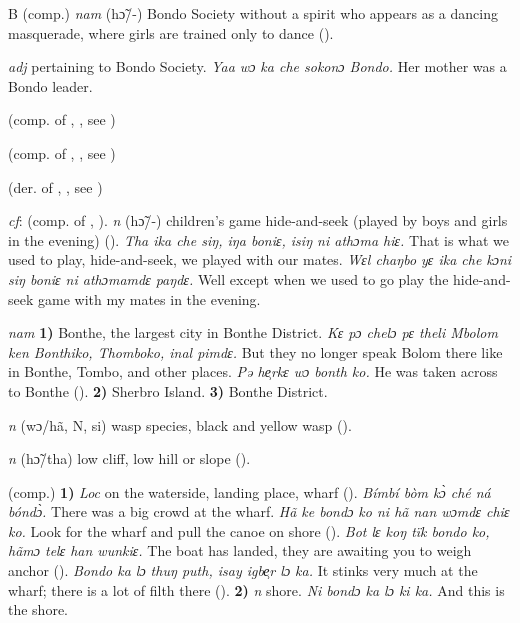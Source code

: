 \begin{letter}{B}
 (comp.) \textit{nam} (hɔ̃/-) Bondo Society without a spirit who appears as a dancing masquerade, where girls are trained only to dance (\citealt{Pichl1967}).

 \textit{adj} pertaining to Bondo Society. \textit{Yaa wɔ ka che sokonɔ Bondo.} Her mother was a Bondo leader.

 (comp. of , , see ) 

 (comp. of , , see ) 

 (der. of , , see ) 

 \textit{cf}:  (comp. of , ). \textit{n} (hɔ̃/-) children's game hide-and-seek (played by boys and girls in the evening) (\citealt{Pichl1967}). \textit{Tha ika che siŋ, iŋa boniɛ, isiŋ ni athɔma hiɛ.} That is what we used to play, hide-and-seek, we played with our mates. \textit{Wɛl chaŋbo yɛ ika che kɔni siŋ boniɛ ni athɔmamdɛ paŋdɛ.} Well except when we used to go play the hide-and-seek game with my mates in the evening.

 \textit{nam} \textbf{1)} Bonthe, the largest city in Bonthe District. \textit{Kɛ pɔ chelɔ pɛ theli Mbolom ken Bonthiko, Thomboko, inal pimdɛ.} But they no longer speak Bolom there like in Bonthe, Tombo, and other places. \textit{Pə he̹rkɛ wɔ bonth ko.} He was taken across to Bonthe (\citealt{Pichl1967}). \textbf{2)} Sherbro Island. \textbf{3)} Bonthe District. 

 \textit{n} (wɔ/hã, N, si) wasp species, black and yellow wasp (\citealt{Pichl1967}). 

 \textit{n} (hɔ̃/tha) low cliff, low hill or slope (\citealt{Pichl1967}).

 (comp.) \textbf{1)} \textit{Loc} on the waterside, landing place, wharf (\citealt{Pichl1967}). \textit{Bímbí bòm kɔ̀ ché ná bóndɔ̀.} There was a big crowd at the wharf. \textit{Hã ke bondɔ ko ni hã nan wɔmdɛ chiɛ ko.} Look for the wharf and pull the canoe on shore (\citealt{Pichl1967}). \textit{Bot lɛ koŋ tïk bondo ko, hãmɔ telɛ han wunkiɛ.} The boat has landed, they are awaiting you to weigh anchor (\citealt{Pichl1967}). \textit{Bondo ka lɔ thuŋ puth, isay igbe̹r lɔ ka.} It stinks very much at the wharf; there is a lot of filth there (\citealt{Pichl1967}). \textbf{2)} \textit{n} shore. \textit{Ni bondɔ ka lɔ ki ka.} And this is the shore. 


\end{letter}
